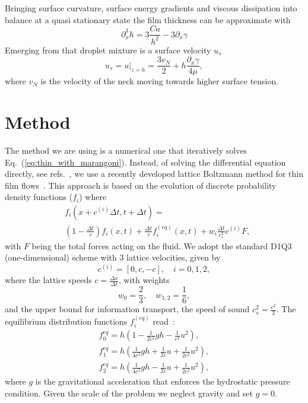\documentclass[twocolumn,amsmath,amssymb,showpacs,pre,nofootinbib,superscriptaddress]{revtex4-1} %
\begin{document}
Bringing surface curvature, surface energy gradients and viscous dissipation into balance at a quasi stationary state the film thickness can be approximate with
\begin{equation}
    \partial_x^3 h = 3 \frac{Ca}{h^2} - 3\partial_x\gamma 
\end{equation}
Emerging from that droplet mixture is a surface velocity $u_s$~\cite{PhysRevLett.109.066103}
\begin{equation}\label{eq:Karpitschka_vel}
    u_s = u|_{z=h} = \frac{3v_N}{2} + h\frac{\partial_x\gamma}{4\mu},
\end{equation}
where $v_N$ is the velocity of the neck moving towards higher surface tension.

\section{Method}\label{sec:method}
The method we are using is a numerical one that iteratively solves Eq.~(\ref{eq:thin_with_marangoni}).
Instead, of solving the differential equation directly, see refs.~\cite{PhysRevE.63.011208, PhysRevLett.119.204501}, we use a recently developed lattice Boltzmann method for thin film flows~\cite{PhysRevE.100.033313, PhysRevE.104.034801}.
This approach is based on the evolution of discrete probability density functions ($f_i$) where
\begin{equation}\label{eq:LBE}
    \begin{split}
        &f_i(x+c^{(i)}\Delta t,t+\Delta t) = \\
        &\left(1 - \frac{\Delta t}{\tau}\right) f_i(x,t) + \frac{\Delta t}{\tau} f_i^{(eq)}(x,t) + w_i \frac{\Delta t}{c_s^2} c^{(i)} F,
    \end{split}
\end{equation}
with $F$ being the total forces acting on the fluid.
We adopt the standard D1Q3 (one-dimensional) scheme with $3$ lattice velocities, given by
\begin{equation}\label{eq:speeds}
c^{(i)}  = [0, c, -c], \quad i = 0, 1, 2,
\end{equation}
where the lattice speeds $c=\frac{\Delta x}{\Delta t}$, with weights
\begin{equation}
w_0 = \frac{2}{3},\quad w_{1,2} = \frac{1}{6},
\end{equation}
and the upper bound for information transport, the speed of sound $c_s^2=\frac{c^2}{3}$.
The equilibrium distribution functions $f_i^{(eq)}$ read~\cite{VANTHANG20107373}:
\begin{gather}
    f_{0}^{eq} = h\left(1-\frac{1}{2c^2}gh - \frac{1}{c^2}u^2\right),\nonumber\\
    f_{1}^{eq} = h\left(\frac{1}{4c^2}gh + \frac{1}{2c}u + \frac{1}{2c^2}u^2\right)\label{eq:equilibria},\\
    f_{2}^{eq} = h\left(\frac{1}{4c^2}gh - \frac{1}{2c}u + \frac{1}{2c^2}u^2\right),\nonumber
\end{gather}
where $g$ is the gravitational acceleration that enforces the hydrostatic pressure condition. 
Given the scale of the problem we neglect gravity and set $g=0$.
\end{document}
